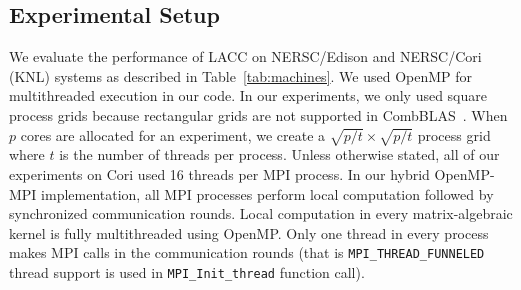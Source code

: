 \subsection{Experimental Setup} 
We evaluate the performance of LACC on NERSC/Edison and NERSC/Cori (KNL) systems  as described in Table~\ref{tab:machines}.
We used OpenMP for multithreaded execution in our code. 
In our experiments, we only used square process grids because rectangular grids are not supported in CombBLAS~\cite{bulucc2011combinatorial}. 
When $p$ cores are allocated for an experiment, we create a $\sqrt{p/t} \times \sqrt{p/t} $ process grid where $t$ is the number of threads per process.
Unless otherwise stated, all of our experiments on Cori used 16 threads per MPI process.
In our hybrid OpenMP-MPI implementation, all MPI processes perform local computation followed by synchronized communication rounds. 
Local computation in every matrix-algebraic kernel is fully multithreaded using OpenMP.
Only one thread in every process makes MPI calls in the communication rounds (that is \texttt{MPI\_THREAD\_FUNNELED} thread support is used in \texttt{MPI\_Init\_thread} function call).


